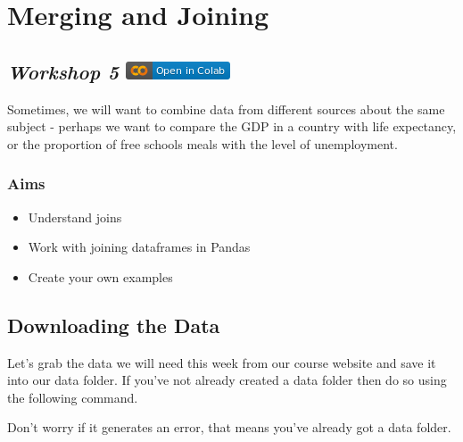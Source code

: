 \documentclass[
  letterpaper,
  DIV=11,
  numbers=noendperiod]{scrreprt}
\providecommand{\tightlist}{%
  \setlength{\itemsep}{0pt}\setlength{\parskip}{0pt}}\usepackage{longtable,booktabs,array}
\begin{document}

\hypertarget{merging-and-joining}{%
\chapter{Merging and Joining}\label{merging-and-joining}}

\hypertarget{workshop-5-open-in-colab}{%
\section[\emph{Workshop 5} ]{\texorpdfstring{\emph{Workshop 5}
\href{https://colab.research.google.com/github/oballinger/QM2/blob/main/notebooks/W05.\%20Merging\%20and\%20Joining.ipynb}{\protect\includegraphics{index_files/mediabag/colab-badge.png}}}{Workshop 5 Open In Colab}}\label{workshop-5-open-in-colab}}

Sometimes, we will want to combine data from different sources about the
same subject - perhaps we want to compare the GDP in a country with life
expectancy, or the proportion of free schools meals with the level of
unemployment.

\hypertarget{aims-2}{%
\subsection{Aims}\label{aims-2}}

\begin{itemize}
\tightlist
\item
  Understand joins
\item
  Work with joining dataframes in Pandas
\item
  Create your own examples
\end{itemize}

\hypertarget{downloading-the-data-2}{%
\section{Downloading the Data}\label{downloading-the-data-2}}

Let's grab the data we will need this week from our course website and
save it into our data folder. If you've not already created a data
folder then do so using the following command.

Don't worry if it generates an error, that means you've already got a
data folder.
\end{document}
